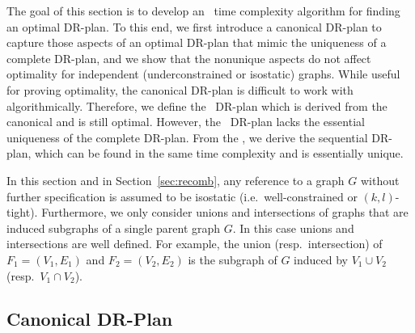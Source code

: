 The goal of this section is to develop an \ComplexityCanDRP\ time complexity algorithm for finding an optimal DR-plan.
To this end, we first introduce a canonical DR-plan to capture those aspects of an optimal DR-plan that mimic the  uniqueness of a complete DR-plan, and we show that the nonunique aspects do not affect optimality for independent (underconstrained or isostatic) graphs.
While useful for proving optimality, the canonical DR-plan is difficult to work with algorithmically. Therefore, we define the \pseudosequential\ DR-plan which is derived from the canonical and is still optimal.
However, the \pseudosequential\ DR-plan lacks the essential uniqueness of the complete DR-plan. From the \pseudosequential, we derive the sequential DR-plan, which can be found in the same time complexity and is essentially unique.

In this section and in Section~\ref{sec:recomb}, any reference to a graph $G$ without further specification is assumed to be isostatic (i.e.\ well-constrained or $(k,l)$-tight). Furthermore, we only consider unions and intersections of graphs that are induced subgraphs of a single parent graph $G$. In this case unions and intersections are well defined. For example, the union (resp.\ intersection) of $F_1 = (V_1, E_1)$ and $F_2 = (V_2, E_2)$ is the subgraph of $G$ induced by $V_1\cup V_2$ (resp.\ $V_1\cap V_2$).



\subsection{Canonical DR-Plan}






